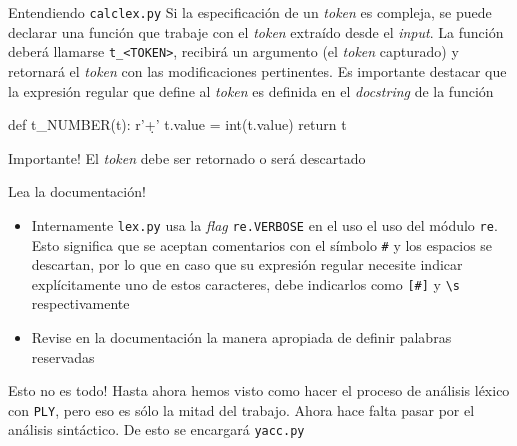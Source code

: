 \documentclass[pdf]{beamer}
\begin{document}
\begin{frame}[fragile]{Entendiendo \texttt{calclex.py}}
	Si la especificación de un \emph{token} es compleja, se puede declarar una función que trabaje con el \emph{token} extraído desde el \emph{input}. La función deberá llamarse \texttt{t\_<TOKEN>}, recibirá un argumento (el \emph{token} capturado) y retornará el \emph{token} con las modificaciones pertinentes. Es importante destacar que la expresión regular que define al \emph{token} es definida en el \emph{docstring} de la función
	
\begin{example}
\begin{python}
def t_NUMBER(t):
    r'\d+'
    t.value = int(t.value)
    return t
\end{python}	
\end{example}

\begin{alertblock}{Importante!}
El \emph{token} debe ser retornado o será descartado
\end{alertblock}

\end{frame}

\begin{frame}{Lea la documentación!}
\begin{itemize}
	\item Internamente \texttt{lex.py} usa la \emph{flag} \texttt{re.VERBOSE} en el uso el uso del módulo \texttt{re}. Esto significa que se aceptan comentarios con el símbolo \texttt{\#} y los espacios se descartan, por lo que en caso que su expresión regular necesite indicar explícitamente uno de estos caracteres, debe indicarlos como \texttt{[\#]} y \texttt{\textbackslash s} respectivamente

	\item Revise en la documentación la manera apropiada de definir palabras reservadas
\end{itemize}

\end{frame}

\begin{frame}{Esto no es todo!}
	Hasta ahora hemos visto como hacer el proceso de análisis léxico con \texttt{PLY}, pero eso es sólo la mitad del trabajo. Ahora hace falta pasar por el análisis sintáctico. De esto se encargará \texttt{yacc.py}
\end{frame}
\end{document}
